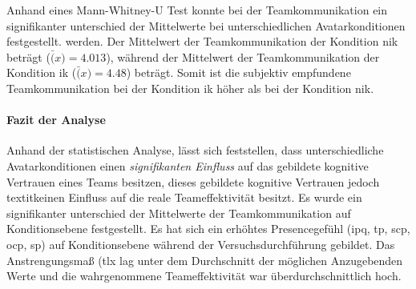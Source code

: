 \documentclass[a4paper,11pt]{article}%
\renewcommand{\\}{\vspace*{0.5\baselineskip} \newline}
\begin{document}
Anhand eines Mann-Whitney-U Test konnte bei der Teamkommunikation ein signifikanter unterschied der Mittelwerte bei unterschiedlichen Avatarkonditionen festgestellt. werden. Der Mittelwert der Teamkommunikation der Kondition \ac{nik} beträgt ($\bar(x) = 4.013$), während der Mittelwert der Teamkommunikation der Kondition \ac{ik} ($\bar(x) = 4.48$) beträgt. Somit ist die subjektiv empfundene Teamkommunikation bei der Kondition \ac{ik} höher als bei der Kondition \ac{nik}.

\paragraph{Fazit der Analyse}
Anhand der statistischen Analyse, lässt sich feststellen, dass unterschiedliche Avatarkonditionen einen \textit{signifikanten Einfluss} auf das gebildete kognitive Vertrauen eines Teams besitzen, dieses gebildete kognitive Vertrauen jedoch textit{keinen Einfluss} auf die reale Teameffektivität besitzt. 
Es wurde ein signifikanter unterschied der Mittelwerte der Teamkommunikation auf Konditionsebene festgestellt. Es hat sich ein erhöhtes Presencegefühl (\ac{ipq}, \ac{tp}, \ac{scp}, \ac{ocp}, \ac{sp}) auf Konditionsebene während der Versuchsdurchführung gebildet. Das Anstrengungsmaß (\ac{tlx} lag unter dem Durchschnitt der möglichen Anzugebenden Werte und die wahrgenommene Teameffektivität war überdurchschnittlich hoch.
\end{document}
